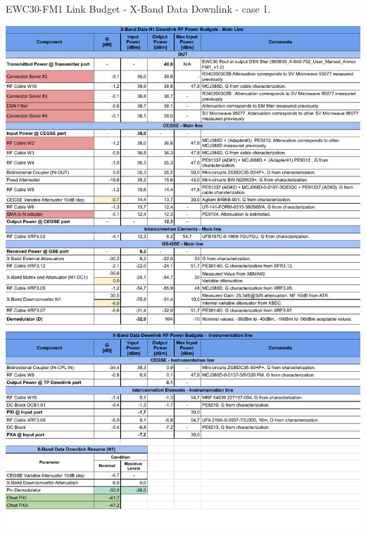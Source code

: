 \begin{table}[H]
	\centering
	\caption{EWC30-FM1 Link Budget - X-Band Data Downlink - case 1.} \label{tb:Data_DWL1}
	\includegraphics[page=1, scale=0.75, trim=0cm 0cm 0cm 0cm, clip ]
	{tables/Ensayos COMM-SS Link Budget - X-Band Data N1 Downlink.pdf}\\
\end{table}

